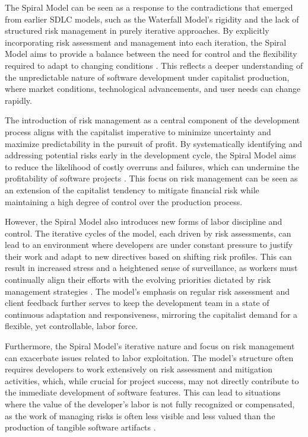 \begin{refsection}
The Spiral Model can be seen as a response to the contradictions that emerged from earlier SDLC models, such as the Waterfall Model's rigidity and the lack of structured risk management in purely iterative approaches. By explicitly incorporating risk assessment and management into each iteration, the Spiral Model aims to provide a balance between the need for control and the flexibility required to adapt to changing conditions \cite[pp.~23-26]{Boehm1986}. This reflects a deeper understanding of the unpredictable nature of software development under capitalist production, where market conditions, technological advancements, and user needs can change rapidly.

The introduction of risk management as a central component of the development process aligns with the capitalist imperative to minimize uncertainty and maximize predictability in the pursuit of profit. By systematically identifying and addressing potential risks early in the development cycle, the Spiral Model aims to reduce the likelihood of costly overruns and failures, which can undermine the profitability of software projects \cite[pp.~45-48]{Fairley2009}. This focus on risk management can be seen as an extension of the capitalist tendency to mitigate financial risk while maintaining a high degree of control over the production process.

However, the Spiral Model also introduces new forms of labor discipline and control. The iterative cycles of the model, each driven by risk assessments, can lead to an environment where developers are under constant pressure to justify their work and adapt to new directives based on shifting risk profiles. This can result in increased stress and a heightened sense of surveillance, as workers must continually align their efforts with the evolving priorities dictated by risk management strategies \cite[pp.~79-82]{Glass2002}. The model’s emphasis on regular risk assessment and client feedback further serves to keep the development team in a state of continuous adaptation and responsiveness, mirroring the capitalist demand for a flexible, yet controllable, labor force.

Furthermore, the Spiral Model's iterative nature and focus on risk management can exacerbate issues related to labor exploitation. The model's structure often requires developers to work extensively on risk assessment and mitigation activities, which, while crucial for project success, may not directly contribute to the immediate development of software features. This can lead to situations where the value of the developer's labor is not fully recognized or compensated, as the work of managing risks is often less visible and less valued than the production of tangible software artifacts \cite[pp.~90-93]{Poppendieck2003}.


\end{refsection}
